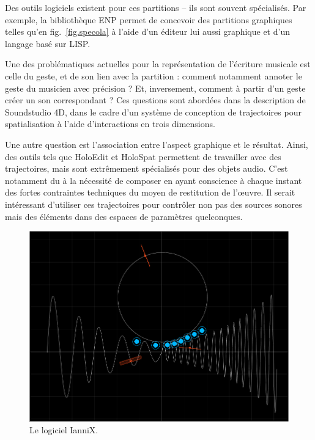 \documentclass[french,12pt]{article}
\begin{document}
Des outils logiciels existent pour ces partitions -- ils sont souvent spécialisés. Par exemple, la bibliothèque \ac{ENP}\cite{kuuskankare_expressive_2006} permet de concevoir des partitions graphiques telles qu'en fig.~\ref{fig.specola} à l'aide d'un éditeur lui aussi graphique et d'un langage basé sur LISP.


Une des problématiques actuelles pour la représentation de l'écriture musicale est celle du geste, et de son lien avec la partition : comment notamment annoter le geste du musicien avec précision ? Et, inversement, comment à partir d'un geste créer un son correspondant ? Ces questions sont abordées dans la description de Soundstudio 4D\cite{sheridan_soundstudio_2004}, dans le cadre d'un système de conception de trajectoires pour spatialisation à l'aide d'interactions en trois dimensions.

Une autre question est l'association entre l'aspect graphique et le résultat. Ainsi, des outils tels que HoloEdit et HoloSpat permettent de travailler avec des trajectoires, mais sont extrêmement spécialisés pour des objets audio. C'est notamment du à la nécessité de composer en ayant conscience à chaque instant des fortes contraintes techniques du moyen de restitution de l'œuvre. Il serait intéressant d'utiliser ces trajectoires pour contrôler non pas des sources sonores mais des éléments dans des espaces de paramètres quelconques.

\begin{figure}[h]
    \centering
    \includegraphics[scale=0.3]{images/iannix.png}
    \caption{Le logiciel IanniX.}
    \label{fig.iannix}
\end{figure}
\end{document}
